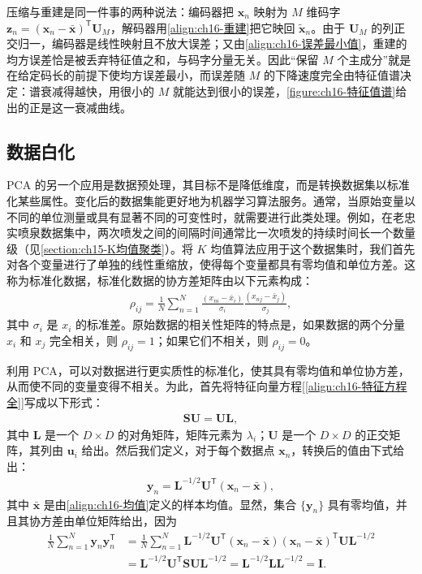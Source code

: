 \documentclass[../../main.tex]{subfiles}
\begin{document}
\begin{remark}
压缩与重建是同一件事的两种说法：编码器把 $\bm{x}_n$ 映射为 $M$ 维码字 $\bm{z}_n=(\bm{x}_n-\bar{\bm{x}})^{\mathsf T}\bm{U}_M$，解码器用\eqref{align:ch16-重建}把它映回 $\tilde{\bm{x}}_n$。由于 $\bm{U}_M$ 的列正交归一，编码器是线性映射且不放大误差；又由\eqref{align:ch16-误差最小值}，重建的均方误差恰是被丢弃特征值之和，与码字分量无关。因此“保留 $M$ 个主成分”就是在给定码长的前提下使均方误差最小，而误差随 $M$ 的下降速度完全由特征值谱决定：谱衰减得越快，用很小的 $M$ 就能达到很小的误差，\cref{figure:ch16-特征值谱}给出的正是这一衰减曲线。
\end{remark}

\subsection{数据白化}\label{subsection:ch16-数据白化}

PCA 的另一个应用是数据预处理，其目标不是降低维度，而是转换数据集以标准化某些属性。变化后的数据集能更好地为机器学习算法服务。通常，当原始变量以不同的单位测量或具有显著不同的可变性时，就需要进行此类处理。例如，在老忠实喷泉数据集中，两次喷发之间的间隔时间通常比一次喷发的持续时间长一个数量级（见\cref{section:ch15-K均值聚类}）。将 $K$ 均值算法应用于这个数据集时，我们首先对各个变量进行了单独的线性重缩放，使得每个变量都具有零均值和单位方差。这称为标准化数据，标准化数据的协方差矩阵由以下元素构成：
\begin{align}
  \rho_{ij}=\frac{1}{N}\sum_{n=1}^{N}\frac{(x_{ni}-\bar{x}_i)}{\sigma_i}\frac{(x_{nj}-\bar{x}_j)}{\sigma_j},
  \label{align:ch16-相关系数}
\end{align}
其中 $\sigma_i$ 是 $x_i$ 的标准差。原始数据的相关性矩阵的特点是，如果数据的两个分量 $x_i$ 和 $x_j$ 完全相关，则 $\rho_{ij}=1$；如果它们不相关，则 $\rho_{ij}=0$。

利用 PCA，可以对数据进行更实质性的标准化，使其具有零均值和单位协方差，从而使不同的变量变得不相关。为此，首先将特征向量方程[\eqref{align:ch16-特征方程全}]写成以下形式：
\begin{align}
  \bm{S}\bm{U}=\bm{U}\bm{L},
  \label{align:ch16-特征分解}
\end{align}
其中 $\bm{L}$ 是一个 $D\times D$ 的对角矩阵，矩阵元素为 $\lambda_i$；$\bm{U}$ 是一个 $D\times D$ 的正交矩阵，其列由 $\bm{u}_i$ 给出。然后我们定义，对于每个数据点 $\bm{x}_n$，转换后的值由下式给出：
\begin{align}
  \bm{y}_n=\bm{L}^{-1/2}\bm{U}^{\mathsf T}(\bm{x}_n-\bar{\bm{x}}),
  \label{align:ch16-白化}
\end{align}
其中 $\bar{\bm{x}}$ 是由\eqref{align:ch16-均值}定义的样本均值。显然，集合 $\{\bm{y}_n\}$ 具有零均值，并且其协方差由单位矩阵给出，因为
\begin{align}
  \frac{1}{N}\sum_{n=1}^{N}\bm{y}_n\bm{y}_n^{\mathsf T}&=\frac{1}{N}\sum_{n=1}^{N}\bm{L}^{-1/2}\bm{U}^{\mathsf T}(\bm{x}_n-\bar{\bm{x}})(\bm{x}_n-\bar{\bm{x}})^{\mathsf T}\bm{U}\bm{L}^{-1/2}\nonumber\\
  &=\bm{L}^{-1/2}\bm{U}^{\mathsf T}\bm{S}\bm{U}\bm{L}^{-1/2}=\bm{L}^{-1/2}\bm{L}\bm{L}^{-1/2}=\bm{I}.
  \label{align:ch16-白化协方差}
\end{align}
\end{document}
